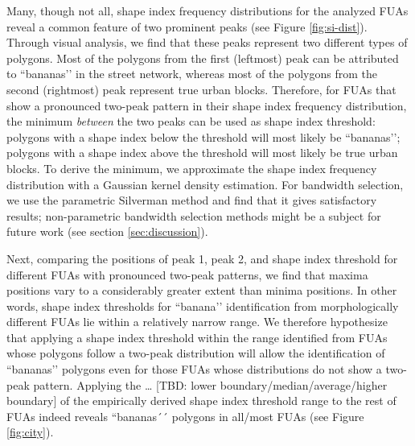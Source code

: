 Many, though not all, shape index frequency distributions for the analyzed FUAs reveal a common feature of two prominent peaks (see Figure \ref{fig:si-dist}). Through visual analysis, we find that these peaks represent two different types of polygons. Most of the polygons from the first (leftmost) peak can be attributed to ``bananas’’ in the street network, whereas most of the polygons from the second (rightmost) peak represent true urban blocks. Therefore, for FUAs that show a pronounced two-peak pattern in their shape index frequency distribution, the minimum \textit{between} the two peaks can be used as shape index threshold: polygons with a shape index below the threshold will most likely be ``bananas’’; polygons with a shape index above the threshold will most likely be true urban blocks. To derive the minimum, we approximate the shape index frequency distribution with a Gaussian kernel density estimation. For bandwidth selection, we use the parametric Silverman method \cite{silverman_using_1981} and find that it gives satisfactory results; non-parametric bandwidth selection methods might be a subject for future work (see section \ref{sec:discussion}).

Next, comparing the positions of peak 1, peak 2, and shape index threshold for different
FUAs with pronounced two-peak patterns, we find that maxima positions vary to a
considerably greater extent than minima positions. In other words, shape index
thresholds for ``banana’’ identification from morphologically different FUAs lie within
a relatively narrow range. We therefore hypothesize that applying a shape index
threshold within the range identified from FUAs whose polygons follow a two-peak
distribution will allow the identification of ``bananas’’ polygons even for those FUAs
whose distributions do not show a two-peak pattern. Applying the … [TBD: lower
boundary/median/average/higher boundary] of the empirically derived shape index
threshold range to the rest of FUAs indeed reveals ``bananas´´ polygons in all/most FUAs
(see Figure \ref{fig:city}).